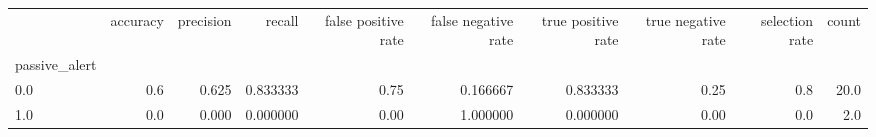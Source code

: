 \begin{tabular}{lrrrrrrrrr}
\toprule
{} &  accuracy &  precision &    recall &  false positive rate &  false negative rate &  true positive rate &  true negative rate &  selection rate &  count \\
passive\_alert &           &            &           &                      &                      &                     &                     &                 &        \\
\midrule
0.0           &       0.6 &      0.625 &  0.833333 &                 0.75 &             0.166667 &            0.833333 &                0.25 &             0.8 &   20.0 \\
1.0           &       0.0 &      0.000 &  0.000000 &                 0.00 &             1.000000 &            0.000000 &                0.00 &             0.0 &    2.0 \\
\bottomrule
\end{tabular}
